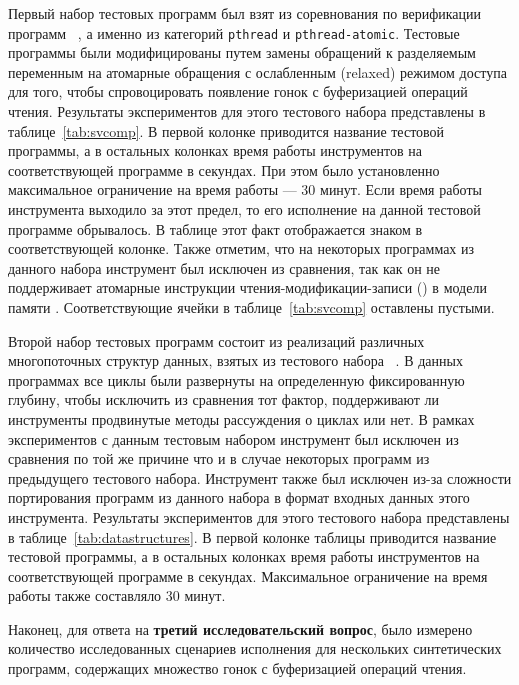 Первый набор тестовых программ был взят 
из соревнования по верификации программ \SVCOMP~\cite{SVCOMP}, 
а именно из категорий \texttt{pthread} и \texttt{pthread-atomic}.
Тестовые программы были модифицированы путем замены 
обращений к разделяемым переменным на атомарные обращения 
с ослабленным (relaxed) режимом доступа 
для того, чтобы спровоцировать появление гонок с буферизацией операций чтения. 
Результаты экспериментов для этого тестового набора 
представлены в таблице~\ref{tab:svcomp}. 
В первой колонке приводится название тестовой программы, 
а в остальных колонках время работы инструментов 
на соответствующей программе в секундах.
При этом было установленно максимальное ограничение на время работы --- 30 минут.
Если время работы инструмента выходило за этот предел, 
то его исполнение на данной тестовой программе обрывалось. 
В таблице этот факт отображается знаком \timeoutNoSpc
в соответствующей колонке.
Также отметим, что на некоторых программах из данного набора 
инструмент \Nidhugg был исключен из сравнения, так как он не поддерживает 
атомарные инструкции чтения-модификации-записи (\RMW) в модели памяти \POWER. 
Соответствующие ячейки в таблице~\ref{tab:svcomp} оставлены пустыми.



Второй набор тестовых программ состоит из 
реализаций различных многопоточных структур данных, 
взятых из тестового набора \CDSChecker~\cite{Norris-Demsky:OOPSLA2013}. 
В данных программах все циклы были развернуты 
на определенную фиксированную глубину, чтобы исключить из сравнения тот фактор, 
поддерживают ли инструменты продвинутые методы рассуждения о циклах или нет. 
В рамках экспериментов с данным тестовым набором инструмент \Nidhugg 
был исключен из сравнения по той же причине что 
и в случае некоторых программ из предыдущего тестового набора. 
Инструмент \rmem также был исключен из-за сложности портирования 
программ из данного набора в формат входных данных этого инструмента.
Результаты экспериментов для этого тестового набора 
представлены в таблице~\ref{tab:datastructures}. 
В первой колонке таблицы приводится название тестовой программы, 
а в остальных колонках время работы инструментов 
на соответствующей программе в секундах.
Максимальное ограничение на время работы также составляло 30 минут.



Наконец, для ответа на \textbf{третий исследовательский вопрос}, 
было измерено количество исследованных \wmc 
сценариев исполнения для нескольких синтетических программ, 
содержащих множество гонок с буферизацией операций чтения. 

